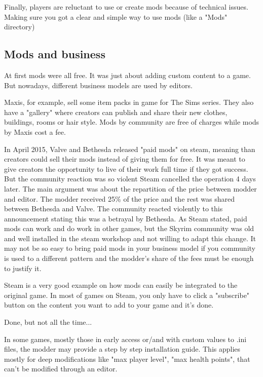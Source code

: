 \documentclass[a4paper,12pt]{article}
\begin{document}
Finally, players are reluctant to use or create mods because of technical issues. Making sure you got a clear and simple way to use mods (like a "Mods" directory)

\newpage
\subsection{Mods and business}

At first mods were all free. It was just about adding custom content to a game. But nowadays, different business models are used by editors.

Maxis, for example, sell some item packs in game for The Sims series. They also have a "gallery" where creators can publish and share their new clothes, buildings, rooms or hair style. Mods by community are free of charges while mods by Maxis cost a fee.

In April 2015, Valve and Bethesda released "paid mods" on steam, meaning than creators could sell their mods instead of giving them for free. It was meant to give creators the opportunity to live of their work full time if they got success. But the community reaction was so violent Steam cancelled the operation 4 days later. The main argument was about the repartition of the price between modder and editor. The modder received 25\% of the price and the rest was shared between Bethesda and Valve. The community reacted violently to this announcement stating this was a betrayal by Bethesda.
As Steam stated, paid mods can work and do work in other games, but the Skyrim community was old and well installed in the steam workshop and not willing to adapt this change. It may not be so easy to bring paid mods in your business model if you community is used to a different pattern and the modder's share of the fees must be enough to justify it.

Steam is a very good example on how mods can easily be integrated to the original game. In most of games on Steam, you only have to click a "subscribe" button on the content you want to add to your game and it's done.

Done, but not all the time...

In some games, mostly those in early access or/and with custom values to .ini files, the modder may provide a step by step installation guide. This applies mostly for deep modifications like "max player level", "max health points", that can't be modified through an editor.
\end{document}
